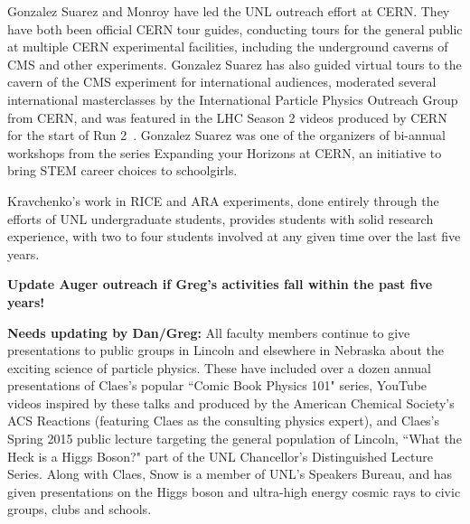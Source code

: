 Gonzalez Suarez and Monroy have led the UNL outreach effort at CERN. They have both been official CERN tour guides, conducting tours for the general public at multiple CERN experimental facilities, including the underground caverns of CMS and other experiments. Gonzalez Suarez has also guided virtual tours to the cavern of the CMS experiment for international audiences, moderated several international masterclasses by the International Particle Physics Outreach Group from CERN, and was featured in the LHC Season 2 videos produced by CERN for the start of Run 2~\cite{bib:LHCSeason2}. Gonzalez Suarez was one of the organizers of bi-annual workshops from the series Expanding your Horizons at CERN, an initiative to bring STEM career choices to schoolgirls. 

Kravchenko's work in RICE and ARA experiments, done entirely through the efforts of UNL undergraduate students, provides students with solid research experience, with two to four students involved at any given time over the last five years.  

{\bf Update Auger outreach if Greg's activities fall within the past five years!}

{\bf Needs updating by Dan/Greg:}
All faculty members continue to give presentations to public groups in Lincoln and elsewhere in Nebraska about the exciting science of particle physics. These have included over a dozen annual presentations of Claes's popular ``Comic Book Physics 101" series, YouTube videos inspired by these talks and produced by the American Chemical Society's ACS Reactions (featuring Claes as the consulting physics expert), and Claes's Spring 2015 public lecture targeting the general population of Lincoln, ``What the Heck is a Higgs Boson?" part of the UNL Chancellor's Distinguished Lecture Series.  Along with Claes, Snow is a member of UNL's Speakers Bureau, and has given presentations on the Higgs boson and ultra-high energy cosmic rays to civic groups, clubs and schools.
